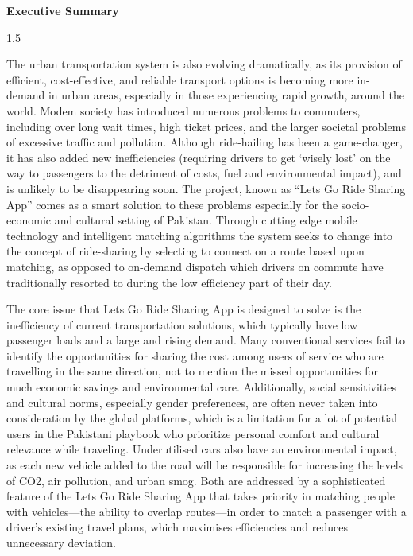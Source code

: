
\newpage
\thispagestyle{plain}


\begin{center}
\textbf{\LARGE Executive Summary}
\end{center}

\vspace{1cm}

\begin{spacing}{1.5}

The urban transportation system is also evolving dramatically, as its provision of efficient, cost-effective, and reliable transport options is becoming more in-demand in urban areas, especially in those experiencing rapid growth, around the world. Modem society has introduced numerous problems to commuters, including over long wait times, high ticket prices, and the larger societal problems of excessive traffic and pollution. Although ride-hailing has been a game-changer, it has also added new inefficiencies (requiring drivers to get ‘wisely lost' on the way to passengers to the detriment of costs, fuel and environmental impact), and is unlikely to be disappearing soon. The project, known as “Lets Go Ride Sharing App” comes as a smart solution to these problems especially for the socio-economic and cultural setting of Pakistan. Through cutting edge mobile technology and intelligent matching algorithms the system seeks to change into the concept of ride-sharing by selecting to connect on a route based upon matching, as opposed to on-demand dispatch which drivers on commute have traditionally resorted to during the low efficiency part of their day.

The core issue that Lets Go Ride Sharing App is designed to solve is the inefficiency of current transportation solutions, which typically have low passenger loads and a large and rising demand. Many conventional services fail to identify the opportunities for sharing the cost among users of service who are travelling in the same direction, not to mention the missed opportunities for much economic savings and environmental care. Additionally, social sensitivities and cultural norms, especially gender preferences, are often never taken into consideration by the global platforms, which is a limitation for a lot of potential users in the Pakistani playbook who prioritize personal comfort and cultural relevance while traveling. Underutilised cars also have an environmental impact, as each new vehicle added to the road will be responsible for increasing the levels of CO2, air pollution, and urban smog. Both are addressed by a sophisticated feature of the Lets Go Ride Sharing App that takes priority in matching people with vehicles—the ability to overlap routes—in order to match a passenger with a driver's existing travel plans, which maximises efficiencies and reduces unnecessary deviation.


\end{spacing}
